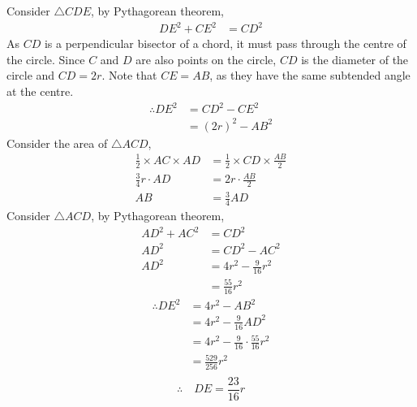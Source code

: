 \documentclass[varwidth=70mm]{standalone}
\begin{document}
\begin{answer}
Consider $\bigtriangleup CDE$, by Pythagorean theorem,
\begin{equation*}
\begin{aligned}
DE^2 + CE^2 &= CD^2
\end{aligned}
\end{equation*}
As $CD$ is a perpendicular bisector of a chord, it must pass through the centre of the circle. Since $C$ and $D$ are also points on the circle, $CD$ is the diameter of the circle and $CD=2r$. Note that $CE=AB$, as they have the same subtended angle at the centre.
\begin{equation*}
\begin{aligned}
\therefore DE^2 &= CD^2 - CE^2 \\
     &= (2r)^2 - AB^2
\end{aligned}
\end{equation*}
Consider the area of $\bigtriangleup ACD$,
\begin{equation*}
\begin{aligned}
\frac{1}{2}\times AC\times AD &= \frac{1}{2}\times CD\times\frac{AB}{2} \\
\frac{3}{4}r\cdot AD &= 2r\cdot \frac{AB}{2} \\
AB &= \frac{3}{4}AD
\end{aligned}
\end{equation*}
Consider $\bigtriangleup ACD$, by Pythagorean theorem,
\begin{equation*}
\begin{aligned}
AD^2 + AC^2 &= CD^2 \\
AD^2 &= CD^2 - AC^2 \\
AD^2 &= 4r^2 - \frac{9}{16}r^2 \\
	 &= \frac{55}{16}r^2
\end{aligned}
\end{equation*}
\begin{equation*}
\begin{aligned}
\therefore DE^2 &= 4r^2 - AB^2 \\
     &= 4r^2 - \frac{9}{16}AD^2 \\
     &= 4r^2 - \frac{9}{16}\cdot\frac{55}{16}r^2 \\
     &= \frac{529}{256}r^2 \\
\end{aligned}
\end{equation*}
$$\therefore\quad DE = \frac{23}{16}r$$
\end{answer}
\end{document}
